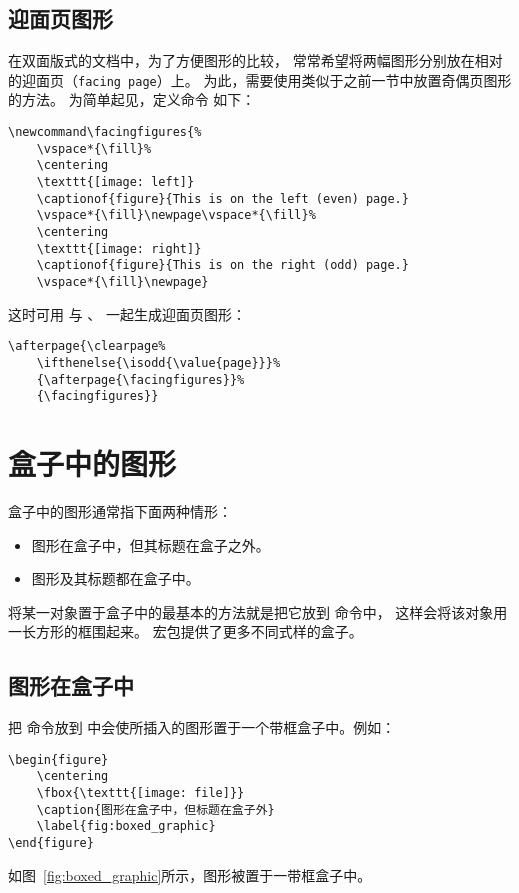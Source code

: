 \subsection{迎面页图形}\label{ssec:fig-facingpage}

在双面版式的文档中，为了方便图形的比较，
常常希望将两幅图形分别放在相对的迎面页（\texttt{facing page}）上。
为此，需要使用类似于之前一节中放置奇偶页图形的方法。
为简单起见，定义命令  如下：
\begin{lstlisting}
\newcommand\facingfigures{%
	\vspace*{\fill}%
	\centering
	\texttt{[image: left]}
	\captionof{figure}{This is on the left (even) page.}
	\vspace*{\fill}\newpage\vspace*{\fill}%
	\centering
	\texttt{[image: right]}
	\captionof{figure}{This is on the right (odd) page.}
	\vspace*{\fill}\newpage}
\end{lstlisting}

这时可用  与 、 一起生成迎面页图形：
\begin{lstlisting}
\afterpage{\clearpage%
	\ifthenelse{\isodd{\value{page}}}%
	{\afterpage{\facingfigures}}%
	{\facingfigures}}
\end{lstlisting}


\section{盒子中的图形}\label{sec:boxfig}

盒子中的图形通常指下面两种情形：
\begin{itemize}
	\item 图形在盒子中，但其标题在盒子之外。
	\item 图形及其标题都在盒子中。
\end{itemize}

将某一对象置于盒子中的最基本的方法就是把它放到  命令中，
这样会将该对象用一长方形的框围起来。
 宏包提供了更多不同式样的盒子。


\subsection{图形在盒子中}\label{ssec:boxgraphic}

把  命令放到  中会使所插入的图形置于一个带框盒子中。例如：
\begin{lstlisting}
\begin{figure}
	\centering
	\fbox{\texttt{[image: file]}}
	\caption{图形在盒子中，但标题在盒子外}
	\label{fig:boxed_graphic}
\end{figure}
\end{lstlisting}
如图~\ref{fig:boxed_graphic}所示，图形被置于一带框盒子中。

